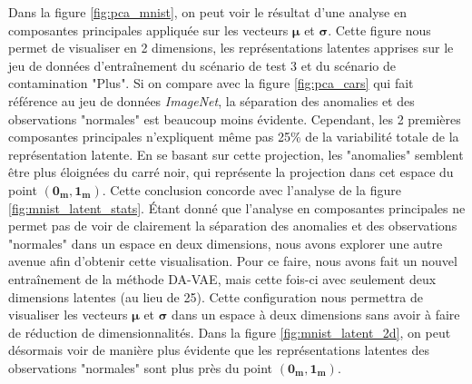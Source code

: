 Dans la figure \ref{fig:pca_mnist}, on peut voir le résultat d'une analyse en composantes principales appliquée sur les vecteurs $\boldsymbol{\mu}$ et $\boldsymbol{\sigma}$. Cette figure nous permet de visualiser en 2 dimensions, les représentations latentes apprises sur le jeu de données d'entraînement du scénario de test 3 et du scénario de contamination "Plus". Si on compare avec la figure \ref{fig:pca_cars} qui fait référence au jeu de données \textit{ImageNet}, la séparation des anomalies et des observations "normales" est beaucoup moins évidente. Cependant, les 2 premières composantes principales n'expliquent même pas 25\% de la variabilité totale de la représentation latente. En se basant sur cette projection, les "anomalies" semblent être plus éloignées du carré noir, qui représente la projection dans cet espace du point $(\boldsymbol{0_{m}}, \boldsymbol{1_{m}})$. Cette conclusion concorde avec l'analyse de la figure \ref{fig:mnist_latent_stats}. Étant donné que l'analyse en composantes principales ne permet pas de voir de clairement la séparation des anomalies et des observations "normales" dans un espace en deux dimensions, nous avons explorer une autre avenue afin d'obtenir cette visualisation. Pour ce faire, nous avons fait un nouvel entraînement de la méthode DA-VAE, mais cette fois-ci avec seulement deux dimensions latentes (au lieu de 25). Cette configuration nous permettra de visualiser les vecteurs $\boldsymbol{\mu}$ et $\boldsymbol{\sigma}$ dans un espace à deux dimensions sans avoir à faire de réduction de dimensionnalités. Dans la figure \ref{fig:mnist_latent_2d}, on peut désormais voir de manière plus évidente que les représentations latentes des observations "normales" sont plus près du point $(\boldsymbol{0_{m}}, \boldsymbol{1_{m}})$.

